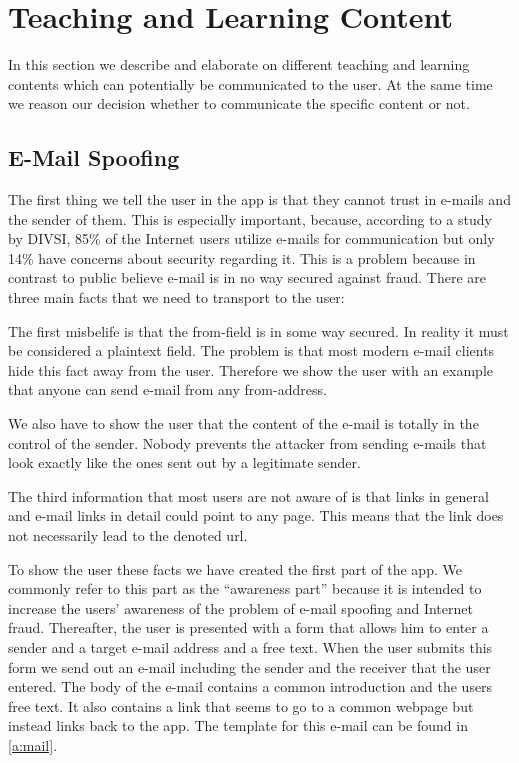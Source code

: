 \section{Teaching and Learning Content}

In this section we describe and elaborate on different teaching and learning contents which can potentially be communicated to the user.
 At the same time we reason our decision whether to communicate the specific content or not.

\subsection{E-Mail Spoofing}
The first thing we tell the user in the app is that they cannot trust in e-mails and the sender of them.
This is especially important, because, according to a study~\cite{divsi2012divsi} by DIVSI, 85\% of the Internet users utilize e-mails for communication but only 14\% have concerns about security regarding it.
This is a problem because in contrast to public believe e-mail is in no way secured against fraud. There are three main facts that we need to transport to the user:
\begin{description}[leftmargin=0cm]
	\item[From Field] The first misbelife is that the from-field is in some way secured.
	In reality it must be considered a plaintext field.
	The problem is that most modern e-mail clients hide this fact away from the user.
	Therefore we show the user with an example that anyone can send e-mail from any from-address.
	\item[E-Mail Content] We also have to show the user that the content of the e-mail is totally in the control of the sender.
	Nobody prevents the attacker from sending e-mails that look exactly like the ones sent out by a legitimate sender.
	\item[Links in E-Mails] The third information that most users are not aware of is that links in general and e-mail links in detail could point to any page. 
	This means that the link does not necessarily lead to the denoted url.
\end{description}
To show the user these facts we have created the first part of the app.
We commonly refer to this part as the ``awareness part'' because it is intended to increase the users' awareness of the problem of e-mail spoofing and Internet fraud.
Thereafter, the user is presented with a form that allows him to enter a sender and a target e-mail address and a free text.
When the user submits this form we send out an e-mail including the sender and the receiver that the user entered.
The body of the e-mail contains a common introduction and the users free text.
It also contains a link that seems to go to a common webpage but instead links back to the app.
The template for this e-mail can be found in \autoref{a:mail}.

